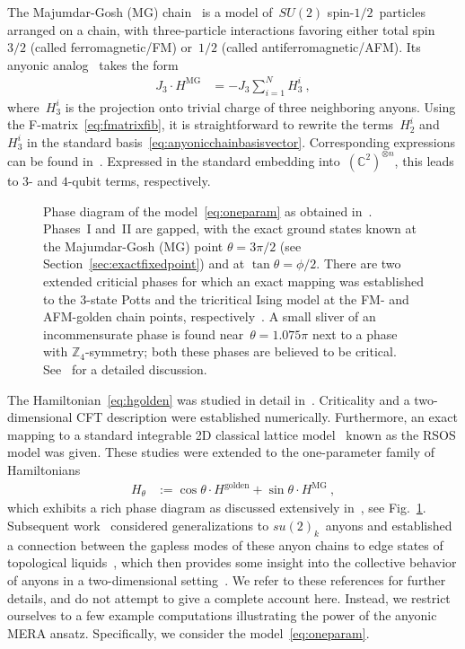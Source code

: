 \documentclass[floats,prb,twocolumn]{revtex4}
\newcommand*{\phasediagram}{\raisebox{-79.263pt}{\epsfig{file=phasediagram87.eps,clip=}}}
\begin{document}
The Majumdar-Gosh (MG) chain~\cite{MajumdarGosh69} is a model of~$SU(2)$ spin-$1/2$~particles arranged on a chain, with three-particle interactions favoring either total spin~$3/2$ (called ferromagnetic/FM) or~$1/2$ (called antiferromagnetic/AFM). Its anyonic analog~\cite{trebstetalcollective08} takes the form
\begin{align}
J_3\cdot H^{\textrm{MG}} &=-J_3\sum_{i=1}^N H^i_3\ ,\label{eq:hmajumdargosh}
\end{align}
where~$H^i_3$ is the projection onto trivial charge of three neighboring anyons.  Using the F-matrix~\eqref{eq:fmatrixfib}, it is straightforward to rewrite the  terms~$H^i_2$ and~$H^i_3$
in the standard basis~\eqref{eq:anyonicchainbasisvector}. Corresponding expressions can be found in~\cite{trebstetalcollective08}. Expressed in the standard embedding into~$(\mathbb{C}^2)^{\otimes n}$, this leads to $3$- and $4$-qubit terms, respectively.

\begin{figure}
\phasediagram
\caption{Phase diagram of the model~\eqref{eq:oneparam} as obtained in~\cite{trebstetalcollective08}. Phases~I and~II are gapped, with the exact ground states known at the Majumdar-Gosh (MG) point $\theta=3\pi/2$ (see Section~\ref{sec:exactfixedpoint}) and at $\tan\theta=\phi/2$. There are two extended criticial phases for which an exact mapping was established to the $3$-state Potts and the tricritical Ising model at the FM- and AFM-golden chain points, respectively~\cite{Feiguinetal07}. A small sliver of an incommensurate phase is found near~$\theta=1.075\pi$ next to a phase with $\mathbb{Z}_4$-symmetry; both these phases are believed to be critical. See~\cite{trebstetalcollective08} for a detailed discussion.\label{fig:phasediagram}}
\end{figure}

The Hamiltonian~\eqref{eq:hgolden} was studied in detail in~\cite{Feiguinetal07}. Criticality and a two-dimensional CFT description were established numerically. Furthermore, an exact mapping to a standard integrable 2D classical lattice model~\cite{andrewsbaxterforrester83} known as the RSOS model was given. These studies were extended to the one-parameter family of Hamiltonians
\begin{align}
H_\theta &:=\cos\theta \cdot H^{\textrm{golden}}+\sin\theta\cdot H^{\textrm{MG}}\ ,\label{eq:oneparam}
\end{align}
which exhibits a rich phase diagram as discussed extensively in~\cite{trebstetalcollective08}, see Fig.~\ref{fig:phasediagram}. Subsequent work~\cite{Gilcollective09,LudwPoil10} considered generalizations to $su(2)_k$~anyons and established a connection between the  gapless modes of these anyon chains to edge states of topological liquids~\cite{Gilcollective09}, which then provides some insight into the collective behavior of anyons in a two-dimensional setting~\cite{Gilcollective09,LudwPoil10}. We refer to these references for further details, and do not attempt to give a complete account here.  Instead, we restrict  ourselves to a few example computations illustrating the power of the anyonic MERA ansatz. Specifically, we consider the model~\eqref{eq:oneparam}.
\end{document}
